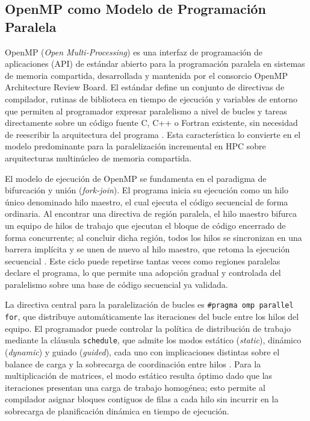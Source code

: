 \subsection{OpenMP como Modelo de Programación Paralela}
OpenMP (\textit{Open Multi-Processing}) es una interfaz de programación de aplicaciones
(API) de estándar abierto para la programación paralela en sistemas de memoria compartida,
desarrollada y mantenida por el consorcio OpenMP Architecture Review Board. El estándar
define un conjunto de directivas de compilador, rutinas de biblioteca en tiempo de ejecución y
variables de entorno que permiten al programador expresar paralelismo a nivel de bucles y
tareas directamente sobre un código fuente C, C++ o Fortran existente, sin necesidad de
reescribir la arquitectura del programa \parencite{Dagum1998OpenMP}. Esta característica lo
convierte en el modelo predominante para la paralelización incremental en HPC sobre
arquitecturas multinúcleo de memoria compartida.

El modelo de ejecución de OpenMP se fundamenta en el paradigma de bifurcación y unión
(\textit{fork-join}). El programa inicia su ejecución como un hilo único denominado hilo maestro,
el cual ejecuta el código secuencial de forma ordinaria. Al encontrar una directiva de región
paralela, el hilo maestro bifurca un equipo de hilos de trabajo que ejecutan el bloque de código
encerrado de forma concurrente; al concluir dicha región, todos los hilos se sincronizan en una
barrera implícita y se unen de nuevo al hilo maestro, que retoma la ejecución secuencial
\parencite{Dagum1998OpenMP}. Este ciclo puede repetirse tantas veces como regiones paralelas
declare el programa, lo que permite una adopción gradual y controlada del paralelismo sobre
una base de código secuencial ya validada.

La directiva central para la paralelización de bucles es \texttt{\#pragma omp parallel for},
que distribuye automáticamente las iteraciones del bucle entre los hilos del equipo. El
programador puede controlar la política de distribución de trabajo mediante la cláusula
\texttt{schedule}, que admite los modos estático (\textit{static}), dinámico (\textit{dynamic})
y guiado (\textit{guided}), cada uno con implicaciones distintas sobre el balance de carga y la
sobrecarga de coordinación entre hilos \parencite{Chapman2008OpenMP}. Para la
multiplicación de matrices, el modo estático resulta óptimo dado que las iteraciones presentan
una carga de trabajo homogénea; esto permite al compilador asignar bloques contiguos de
filas a cada hilo sin incurrir en la sobrecarga de planificación dinámica en tiempo de ejecución.

